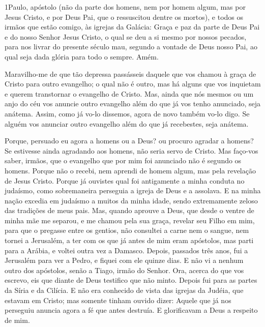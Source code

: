 
\lettrine{1} Paulo, apóstolo (não da parte dos homens, nem por
homem algum, mas por Jesus Cristo, e por Deus Pai, que o ressuscitou
dentre os mortos), e todos os irmãos que estão comigo, às
igrejas da Galácia: Graça e paz da parte de Deus Pai e do nosso
Senhor Jesus Cristo, o qual se deu a si mesmo por nossos
pecados, para nos livrar do presente século mau, segundo a vontade
de Deus nosso Pai, ao qual seja dada glória para todo o sempre.
Amém.

Maravilho-me de que tão depressa passásseis daquele que vos chamou
à graça de Cristo para outro evangelho; o qual não é outro, mas
há alguns que vos inquietam e querem transtornar o evangelho de
Cristo. Mas, ainda que nós mesmos ou um anjo do céu vos anuncie
outro evangelho além do que já vos tenho anunciado, seja anátema.
Assim, como já vo-lo dissemos, agora de novo também vo-lo digo.
Se alguém vos anunciar outro evangelho além do que já recebestes,
seja anátema.

Porque, persuado eu agora a homens ou a Deus? ou procuro agradar
a homens? Se estivesse ainda agradando aos homens, não seria servo
de Cristo. Mas faço-vos saber, irmãos, que o evangelho que
por mim foi anunciado não é segundo os homens. Porque não o
recebi, nem aprendi de homem algum, mas pela revelação de Jesus
Cristo. Porque já ouvistes qual foi antigamente a minha
conduta no judaísmo, como sobremaneira perseguia a igreja de Deus e
a assolava. E na minha nação excedia em judaísmo a muitos da
minha idade, sendo extremamente zeloso das tradições de meus pais.
Mas, quando aprouve a Deus, que desde o ventre de minha mãe
me separou, e me chamou pela sua graça, revelar seu Filho em
mim, para que o pregasse entre os gentios, não consultei a carne nem
o sangue, nem tornei a Jerusalém, a ter com os que já antes
de mim eram apóstolos, mas parti para a Arábia, e voltei outra vez a
Damasco. Depois, passados três anos, fui a Jerusalém para ver
a Pedro, e fiquei com ele quinze dias. E não vi a nenhum
outro dos apóstolos, senão a Tiago, irmão do Senhor. Ora,
acerca do que vos escrevo, eis que diante de Deus testifico que não
minto. Depois fui para as partes da Síria e da Cilícia.
E não era conhecido de vista das igrejas da Judéia, que
estavam em Cristo; mas somente tinham ouvido dizer: Aquele
que já nos perseguiu anuncia agora a fé que antes destruía. E
glorificavam a Deus a respeito de mim.

\medskip

